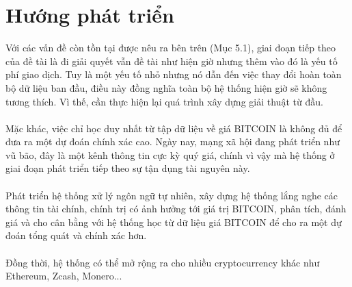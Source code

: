 \section{Hướng phát triển}
Với các vấn đề còn tồn tại được nêu ra bên trên (Mục 5.1), giai đoạn tiếp theo 
của đề tài là đi giải quyết vẫn đề tài như hiện giờ nhưng thêm vào đó là yếu 
tố phí giao dịch. Tuy là một yếu tố nhỏ nhưng nó dẫn đến việc thay đổi hoàn toàn 
bộ dữ liệu ban đầu, điều này đồng nghĩa toàn bộ hệ thống hiện giờ sẽ không 
tương thích. Vì thế, cần thực hiện lại quá trình xây dựng giải thuật từ đầu.\\\\
Mặc khác, việc chỉ học duy nhất từ tập dữ liệu về giá BITCOIN là không đủ để 
đưa ra một dự đoán chính xác cao. Ngày nay, mạng xã hội đang phát triển như vũ 
bão, đây là một kênh thông tin cực kỳ quý giá, chính vì vậy mà hệ thống ở giai 
đoạn phát triển tiếp theo sự tận dụng tài nguyên này.\\\\
Phát triển hệ thống xử lý ngôn ngữ tự nhiên, xây dựng hệ thống lắng nghe các 
thông tin tài chính, chính trị có ảnh hưởng tới giá trị BITCOIN, phân tích, 
đánh giá và cho cân bằng với hệ thống học từ dữ liệu giá BITCOIN để cho ra một 
dự đoán tổng quát và chính xác hơn.\\\\
Đồng thời, hệ thống có thể mở rộng ra cho nhiều cryptocurrency khác như Ethereum,
Zcash, Monero...